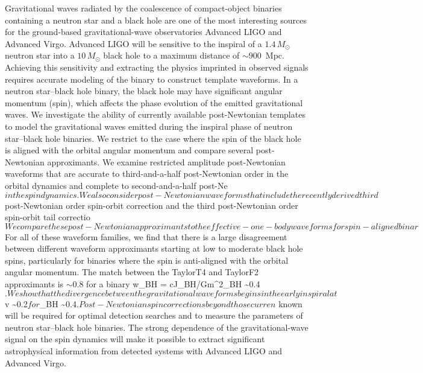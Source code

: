 Gravitational waves radiated by the coalescence of compact-object binaries
containing a neutron star and a black hole are one of the most interesting
sources for the ground-based gravitational-wave observatories Advanced LIGO and
Advanced Virgo. Advanced LIGO will be sensitive to the inspiral of a $1.4\, M_\odot$
neutron star into a $10\,M_\odot$ black hole to a maximum distance of $\sim 900$~Mpc.
Achieving this sensitivity and extracting the physics imprinted in
observed signals requires accurate modeling of the binary to construct
template waveforms. In a neutron star--black hole binary, the black hole may
have significant angular momentum (spin), which affects the phase evolution of
the emitted gravitational waves. We investigate the ability of currently available
post-Newtonian templates to model the gravitational waves emitted during the
inspiral phase of neutron star--black hole binaries. We restrict to the case where the spin of the
black hole is aligned with the orbital angular momentum and compare several
post-Newtonian approximants. We examine
restricted amplitude post-Newtonian waveforms that are accurate to
third-and-a-half post-Newtonian order in the orbital dynamics and complete to second-and-a-half post-Ne$
in the spin dynamics. We also consider post-Newtonian waveforms that include the recently derived third$
post-Newtonian order spin-orbit correction and the third post-Newtonian order spin-orbit tail correctio$
We compare these post-Newtonian approximants to the effective-one-body waveforms for spin-aligned binar$
For all of these waveform families, we find that
 there is a large disagreement between
different waveform approximants starting at low to moderate black hole spins,
particularly for binaries where the spin is anti-aligned with the orbital
angular momentum. The match between the TaylorT4 and TaylorF2 approximants is $\sim 0.8$ for a binary w$
$\chi_{BH} = cJ_{BH}/Gm^2_{BH} \sim 0.4$.
We show that the divergence between the gravitational waveforms begins in the early
inspiral at $v \sim 0.2$ for $\chi_{BH} \sim 0.4$.  Post-Newtonian spin corrections beyond those curren$
known will be required for optimal detection searches and to measure the
parameters of neutron star--black hole binaries. The strong dependence of
the gravitational-wave signal on the spin dynamics will make it possible to extract significant
astrophysical information from detected systems with Advanced LIGO and
Advanced Virgo.

